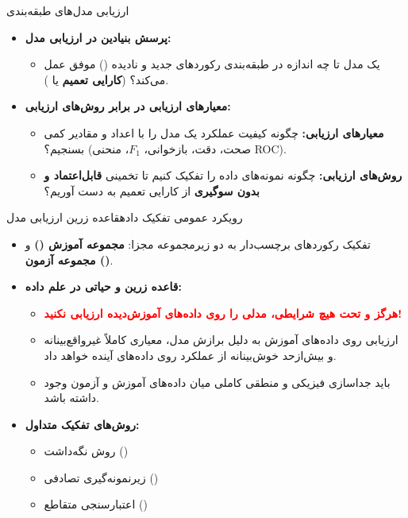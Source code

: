 \begin{frame}{ارزیابی مدل‌های طبقه‌بندی}{}
  \begin{itemize}
    \setlength{\itemsep}{12pt}
    \item \textbf{پرسش بنیادین در ارزیابی مدل:}
    \begin{itemize}
      \item یک مدل تا چه اندازه در طبقه‌بندی رکوردهای جدید و نادیده () موفق عمل می‌کند؟ (\textbf{کارایی تعمیم} یا ).
    \end{itemize}
    \item \textbf{معیارهای ارزیابی در برابر روش‌های ارزیابی:}
    \begin{itemize}
      \setlength{\itemsep}{4pt}
      \item \textbf{معیارهای ارزیابی:}  چگونه کیفیت عملکرد یک مدل را با اعداد و مقادیر کمی بسنجیم؟ (صحت، دقت، بازخوانی، $F_1$، منحنی ROC).
      \item \textbf{روش‌های ارزیابی:}  چگونه نمونه‌های داده را تفکیک کنیم تا تخمینی \textbf{قابل‌اعتماد و بدون سوگیری} از کارایی تعمیم به دست آوریم؟
    \end{itemize}
  \end{itemize}
\end{frame}

\begin{frame}{رویکرد عمومی تفکیک داده}{قاعده زرین ارزیابی مدل}
  \begin{itemize}
    \setlength{\itemsep}{8pt}
    \item تفکیک رکوردهای برچسب‌دار به دو زیرمجموعه مجزا: \textbf{مجموعه آموزش ()} و \textbf{مجموعه آزمون ()}.
    \item \textbf{قاعده زرین و حیاتی در علم داده:}
    \begin{itemize}
      \item \textcolor{red}{\textbf{هرگز و تحت هیچ شرایطی، مدلی را روی داده‌های آموزش‌دیده ارزیابی نکنید!}}
      \item ارزیابی روی داده‌های آموزش به دلیل برازش مدل، معیاری کاملاً غیرواقع‌بینانه و بیش‌ازحد خوش‌بینانه از عملکرد روی داده‌های آینده خواهد داد.
      \item باید جداسازی فیزیکی و منطقی کاملی میان داده‌های آموزش و آزمون وجود داشته باشد.
    \end{itemize}
    \item \textbf{روش‌های تفکیک متداول:}
    \begin{itemize}
      \item روش نگه‌داشت ()
      \item زیرنمونه‌گیری تصادفی ()
      \item اعتبارسنجی متقاطع ()
    \end{itemize}
  \end{itemize}
\end{frame}

